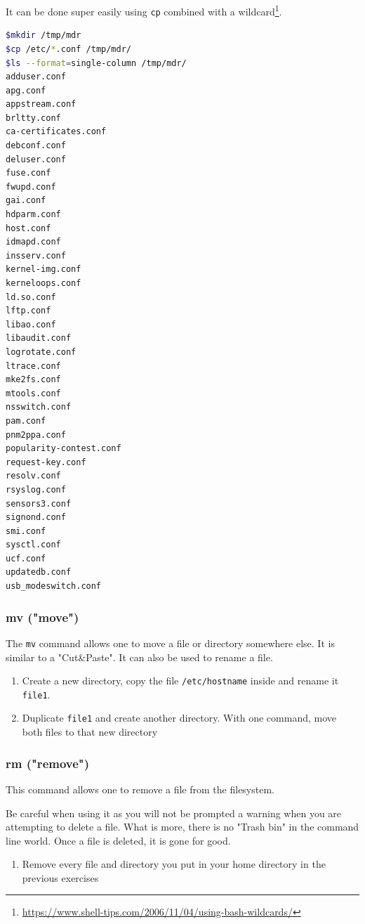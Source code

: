 \documentclass[12pt]{article}
\begin{document}
It can be done super easily using \texttt{cp} combined with a wildcard\footnote{\url{https://www.shell-tips.com/2006/11/04/using-bash-wildcards/}}.

\begin{lstlisting}[language=bash]
$mkdir /tmp/mdr
$cp /etc/*.conf /tmp/mdr/
$ls --format=single-column /tmp/mdr/
adduser.conf
apg.conf
appstream.conf
brltty.conf
ca-certificates.conf
debconf.conf
deluser.conf
fuse.conf
fwupd.conf
gai.conf
hdparm.conf
host.conf
idmapd.conf
insserv.conf
kernel-img.conf
kerneloops.conf
ld.so.conf
lftp.conf
libao.conf
libaudit.conf
logrotate.conf
ltrace.conf
mke2fs.conf
mtools.conf
nsswitch.conf
pam.conf
pnm2ppa.conf
popularity-contest.conf
request-key.conf
resolv.conf
rsyslog.conf
sensors3.conf
signond.conf
smi.conf
sysctl.conf
ucf.conf
updatedb.conf
usb_modeswitch.conf
\end{lstlisting}

\subsubsection{mv ("move")}

The \texttt{mv} command allows one to move a file or directory somewhere else. It is similar to a "Cut\&Paste".
It can also be used to rename a file.

\begin{enumerate}
\item Create a new directory, copy the file \texttt{/etc/hostname} inside and rename it \texttt{file1}.
\item Duplicate \texttt{file1} and create another directory. With one command, move both files to that new directory
\end{enumerate}

\subsubsection{rm ("remove")}

This command allows one to remove a file from the filesystem.

Be careful when using it as you will not be prompted a warning when you are attempting to delete a file. What is more, there is no "Trash bin" in the command line world. Once a file is deleted, it is gone for good.

\begin{enumerate}
\item Remove every file and directory you put in your home directory in the previous exercises
\end{enumerate}
\end{document}
